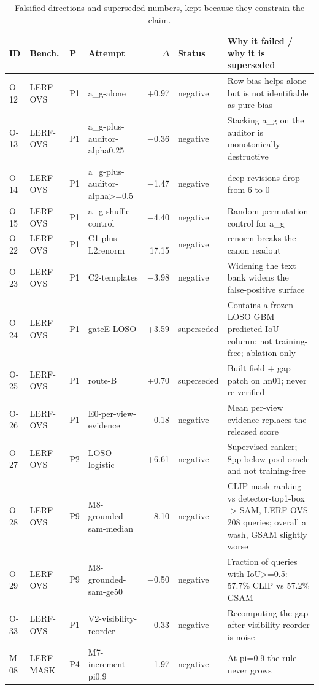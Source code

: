 \begin{table}[t]
\centering
\small
\caption{Falsified directions and superseded numbers, kept because they constrain the claim.}
\label{tab:neg}
\begin{tabular}{llllrlp{6.0cm}}
\toprule
ID & Bench. & P & Attempt & $\Delta$ & Status & Why it failed / why it is superseded \\
\midrule
O-12 & LERF-OVS & P1 & a\_g-alone & +0.97 & negative & Row bias helps alone but is not identifiable as pure bias \\
O-13 & LERF-OVS & P1 & a\_g-plus-auditor-alpha0.25 & $-$0.36 & negative & Stacking a\_g on the auditor is monotonically destructive \\
O-14 & LERF-OVS & P1 & a\_g-plus-auditor-alpha>=0.5 & $-$1.47 & negative & deep revisions drop from 6 to 0 \\
O-15 & LERF-OVS & P1 & a\_g-shuffle-control & $-$4.40 & negative & Random-permutation control for a\_g \\
O-22 & LERF-OVS & P1 & C1-plus-L2renorm & $-$17.15 & negative & renorm breaks the canon readout \\
O-23 & LERF-OVS & P1 & C2-templates & $-$3.98 & negative & Widening the text bank widens the false-positive surface \\
O-24 & LERF-OVS & P1 & gateE-LOSO & +3.59 & superseded & Contains a frozen LOSO GBM predicted-IoU column; not training-free; ablation only \\
O-25 & LERF-OVS & P1 & route-B & +0.70 & superseded & Built field + gap patch on hn01; never re-verified \\
O-26 & LERF-OVS & P1 & E0-per-view-evidence & $-$0.18 & negative & Mean per-view evidence replaces the released score \\
O-27 & LERF-OVS & P2 & LOSO-logistic & +6.61 & negative & Supervised ranker; 8pp below pool oracle and not training-free \\
O-28 & LERF-OVS & P9 & M8-grounded-sam-median & $-$8.10 & negative & CLIP mask ranking vs detector-top1-box -> SAM, LERF-OVS 208 queries; overall a wash, GSAM slightly worse \\
O-29 & LERF-OVS & P9 & M8-grounded-sam-ge50 & $-$0.50 & negative & Fraction of queries with IoU>=0.5: 57.7\% CLIP vs 57.2\% GSAM \\
O-33 & LERF-OVS & P1 & V2-visibility-reorder & $-$0.33 & negative & Recomputing the gap after visibility reorder is noise \\
M-08 & LERF-MASK & P4 & M7-increment-pi0.9 & $-$1.97 & negative & At pi=0.9 the rule never grows \\

\end{tabular}
\end{table}
